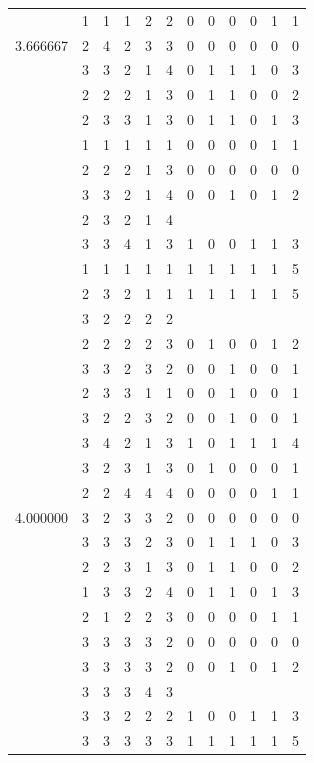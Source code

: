 \documentclass[]{book}
\theoremstyle{definition}
\theoremstyle{definition}
\theoremstyle{definition}
\theoremstyle{remark}
\begin{document}
\begin{table}
{\begin{tabular}[t]{rrrrrrrrrrrr}
 & 1 & 1 & 1 & 2 & 2 & 0 & 0 & 0 & 0 & 1 & 1\\
3.666667 & 2 & 4 & 2 & 3 & 3 & 0 & 0 & 0 & 0 & 0 & 0\\
 & 3 & 3 & 2 & 1 & 4 & 0 & 1 & 1 & 1 & 0 & 3\\
 & 2 & 2 & 2 & 1 & 3 & 0 & 1 & 1 & 0 & 0 & 2\\
 & 2 & 3 & 3 & 1 & 3 & 0 & 1 & 1 & 0 & 1 & 3\\
 & 1 & 1 & 1 & 1 & 1 & 0 & 0 & 0 & 0 & 1 & 1\\
 & 2 & 2 & 2 & 1 & 3 & 0 & 0 & 0 & 0 & 0 & 0\\
 & 3 & 3 & 2 & 1 & 4 & 0 & 0 & 1 & 0 & 1 & 2\\
 & 2 & 3 & 2 & 1 & 4 &  &  &  &  &  & \\
 & 3 & 3 & 4 & 1 & 3 & 1 & 0 & 0 & 1 & 1 & 3\\
 & 1 & 1 & 1 & 1 & 1 & 1 & 1 & 1 & 1 & 1 & 5\\
 & 2 & 3 & 2 & 1 & 1 & 1 & 1 & 1 & 1 & 1 & 5\\
 & 3 & 2 & 2 & 2 & 2 &  &  &  &  &  & \\
 & 2 & 2 & 2 & 2 & 3 & 0 & 1 & 0 & 0 & 1 & 2\\
 & 3 & 3 & 2 & 3 & 2 & 0 & 0 & 1 & 0 & 0 & 1\\
 & 2 & 3 & 3 & 1 & 1 & 0 & 0 & 1 & 0 & 0 & 1\\
 & 3 & 2 & 2 & 3 & 2 & 0 & 0 & 1 & 0 & 0 & 1\\
 & 3 & 4 & 2 & 1 & 3 & 1 & 0 & 1 & 1 & 1 & 4\\
 & 3 & 2 & 3 & 1 & 3 & 0 & 1 & 0 & 0 & 0 & 1\\
 & 2 & 2 & 4 & 4 & 4 & 0 & 0 & 0 & 0 & 1 & 1\\
4.000000 & 3 & 2 & 3 & 3 & 2 & 0 & 0 & 0 & 0 & 0 & 0\\
 & 3 & 3 & 3 & 2 & 3 & 0 & 1 & 1 & 1 & 0 & 3\\
 & 2 & 2 & 3 & 1 & 3 & 0 & 1 & 1 & 0 & 0 & 2\\
 & 1 & 3 & 3 & 2 & 4 & 0 & 1 & 1 & 0 & 1 & 3\\
 & 2 & 1 & 2 & 2 & 3 & 0 & 0 & 0 & 0 & 1 & 1\\
 & 3 & 3 & 3 & 3 & 2 & 0 & 0 & 0 & 0 & 0 & 0\\
 & 3 & 3 & 3 & 3 & 2 & 0 & 0 & 1 & 0 & 1 & 2\\
 & 3 & 3 & 3 & 4 & 3 &  &  &  &  &  & \\
 & 3 & 3 & 2 & 2 & 2 & 1 & 0 & 0 & 1 & 1 & 3\\
 & 3 & 3 & 3 & 3 & 3 & 1 & 1 & 1 & 1 & 1 & 5\\

\end{tabular}}
\end{table}
\end{document}
